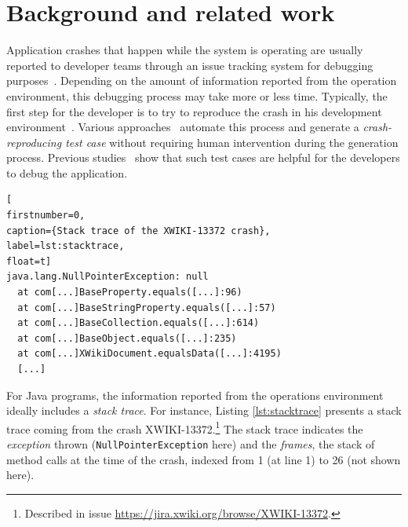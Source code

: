 
\section{Background and related work}\label{sec:model_seeding:background}


Application crashes that happen while the system is operating are usually reported to developer teams through an issue tracking system for debugging purposes~\cite{DBLP:conf/iwpc/WhiteVJBP15}. Depending on the amount of information reported from the operation environment, this debugging process may take more or less time. Typically, the first step for the developer is to try to reproduce the crash in his development environment~\cite{Zeller2009}. Various approaches~\cite{Chen2015, Nayrolles2017, Xuan2015, BPT17concrash, soltani2017} automate this process and generate a \emph{crash-reproducing test case} without requiring human intervention during the generation process.  Previous studies~\cite{Chen2015,Soltani2018a} show that such test cases are helpful for the developers to debug the application.

\begin{lstlisting}[
firstnumber=0,
caption={Stack trace of the XWIKI-13372 crash},
label=lst:stacktrace,
float=t]
java.lang.NullPointerException: null
  at com[...]BaseProperty.equals([...]:96)
  at com[...]BaseStringProperty.equals([...]:57)
  at com[...]BaseCollection.equals([...]:614)
  at com[...]BaseObject.equals([...]:235)
  at com[...]XWikiDocument.equalsData([...]:4195)
  [...]
\end{lstlisting}

For Java programs, the information reported from the operations environment ideally includes a \emph{stack trace}. For instance, Listing \ref{lst:stacktrace} presents a stack trace coming from the crash XWIKI-13372.\footnote{Described in  issue \url{https://jira.xwiki.org/browse/XWIKI-13372}.} The stack trace indicates the \emph{exception} thrown (\texttt{Null\-Pointer\-Exception} here) and the \emph{frames}, \ie the stack of method calls at the time of the crash, indexed from 1 (at line 1) to 26 (not shown here).

